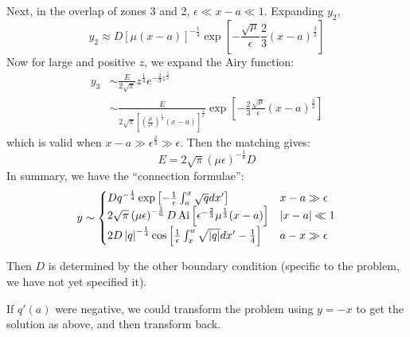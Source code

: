 \documentclass[../Main.tex]{subfiles}
\begin{document}
Next, in the overlap of zones 3 and 2, $\epsilon \ll x - a \ll 1$. Expanding $y_2$,
\begin{equation*}
    y_2 \approx D\left[\mu(x-a)\right]^{-\frac14} \exp\left[-\frac{\sqrt{\mu}}\epsilon \frac23 (x-a)^{\frac32}\right]
\end{equation*}
Now for large and positive $z$, we expand the Airy function:
\begin{align*}
    y_3 &\sim \frac{E}{2\sqrt{\pi}} z^{\frac14} e^{-\frac23 z^{\frac32}} \\
    &\sim \frac{E}{2\sqrt{\pi}\left[\left(\frac{\mu}{\epsilon^2}\right)^{\frac13}(x-a)\right]^{\frac14}} \exp\left[-\frac23 \frac{\sqrt{\mu}}{\epsilon}(x-a)^{\frac32}\right]
\end{align*}
which is valid when $x - a \gg \epsilon^{\frac23} \gg \epsilon$. Then the matching gives:
\begin{equation*}
    E = 2\sqrt{\pi} \left(\mu\epsilon\right)^{-\frac16} D
\end{equation*}
In summary, we have the ``connection formulae'':
\begin{equation*}
    y \sim
    \begin{cases}
        Dq^{-\frac14} \exp \left[-\frac1\epsilon \int_a^x \sqrt{q} dx'\right] & x - a \gg \epsilon \\
        2\sqrt{\pi} \left(\mu\epsilon\right)^{-\frac16} D \operatorname{Ai}\left[\epsilon^{-\frac23} \mu^{\frac13} (x-a)\right] & \left|x-a\right| \ll 1 \\
        2D \left|q\right|^{-\frac14} \cos\left[\frac1\epsilon \int_x^a \sqrt{\left|q\right|} dx' - \frac14\right] & a - x \gg \epsilon
    \end{cases}
\end{equation*}
\begin{remarks}
    \item Then $D$ is determined by the other boundary condition (specific to the problem, we have not yet specified it).
    \item If $q'(a)$ were negative, we could transform the problem using $y = -x$ to get the solution as above, and then transform back.
\end{remarks}
\end{document}
